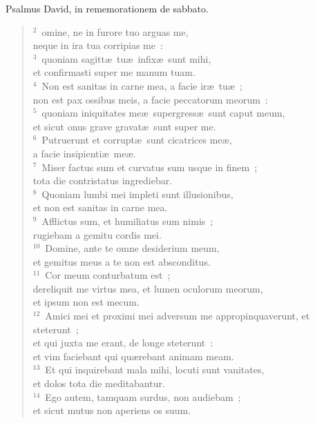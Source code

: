\bchapter[Psalm]
Psalmus David, in rememorationem de sabbato.
\begin{verse}${}^{2}$~omine, ne in furore tuo arguas me,\\ neque in ira tua corripias me~:\\
${}^{3}$~quoniam sagitt\ae\ tu\ae\ infix\ae\ sunt mihi,\\ et confirmasti super me manum tuam.\\
${}^{4}$~Non est sanitas in carne mea, a facie ir\ae\ tu\ae~;\\ non est pax ossibus meis, a facie peccatorum meorum~:\\
${}^{5}$~quoniam iniquitates me\ae\ supergress\ae\ sunt caput meum,\\ et sicut onus grave gravat\ae\ sunt super me.\\
${}^{6}$~Putruerunt et corrupt\ae\ sunt cicatrices me\ae ,\\ a facie insipienti\ae\ me\ae .\\
${}^{7}$~Miser factus sum et curvatus sum usque in finem~;\\ tota die contristatus ingrediebar.\\
${}^{8}$~Quoniam lumbi mei impleti sunt illusionibus,\\ et non est sanitas in carne mea.\\
${}^{9}$~Afflictus sum, et humiliatus sum nimis~;\\ rugiebam a gemitu cordis mei.\\
${}^{10}$~Domine, ante te omne desiderium meum,\\ et gemitus meus a te non est absconditus.\\
${}^{11}$~Cor meum conturbatum est~;\\ dereliquit me virtus mea, et lumen oculorum meorum,\\ et ipsum non est mecum.\\
${}^{12}$~Amici mei et proximi mei adversum me appropinquaverunt, et steterunt~;\\ et qui juxta me erant, de longe steterunt~:\\ et vim faciebant qui qu\ae rebant animam meam.\\
${}^{13}$~Et qui inquirebant mala mihi, locuti sunt vanitates,\\ et dolos tota die meditabantur.\\
${}^{14}$~Ego autem, tamquam surdus, non audiebam~;\\ et sicut mutus non aperiens os suum.\\

\end{verse}
